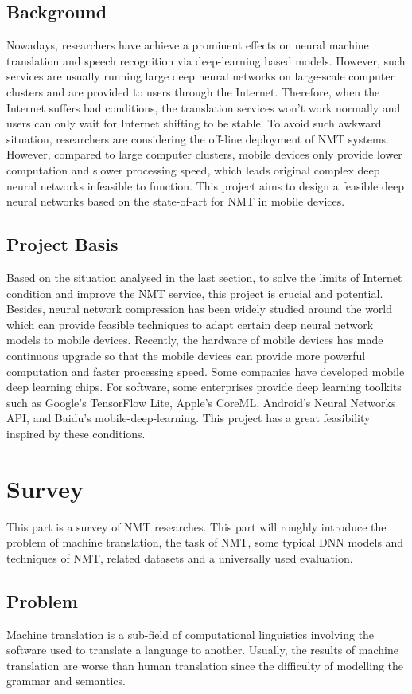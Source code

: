 \documentclass[a4paper, 12pt]{article}
\begin{document}
\subsection{Background}
Nowadays, researchers have achieve a prominent effects on neural machine translation and speech recognition via deep-learning based models. However, such services are usually running large deep neural networks on large-scale computer clusters and are provided to users through the Internet. Therefore, when the Internet suffers bad conditions, the translation services won't work normally and users can only wait for Internet shifting to be stable. To avoid such awkward situation, researchers are considering the off-line deployment of NMT systems. However, compared to large computer clusters, mobile devices only provide lower computation and slower processing speed, which leads original complex deep neural networks infeasible to function. This project aims to design a feasible deep neural networks based on the state-of-art for NMT in mobile devices.

\subsection{Project Basis}
Based on the situation analysed in the last section, to solve the limits of Internet condition and improve the NMT service, this project is crucial and potential. Besides, neural network compression has been widely studied around the world which can provide feasible techniques to adapt certain deep neural network models to mobile devices. Recently, the hardware of mobile devices has made continuous upgrade so that the mobile devices can provide more powerful computation and faster processing speed. Some companies have developed mobile deep learning chips. For software, some enterprises provide deep learning toolkits such as Google's TensorFlow Lite, Apple's CoreML, Android's Neural Networks API, and Baidu's mobile-deep-learning. This project has a great feasibility inspired by these conditions.    

\section{Survey}
This part is a survey of NMT researches. This part will roughly introduce the problem of machine translation, the task of NMT, some typical DNN models and techniques of NMT, related datasets and a universally used evaluation. 

\subsection{Problem}
Machine translation is a sub-field of computational linguistics involving the software used to translate a language to another. Usually, the results of machine translation are worse than human translation since the difficulty of modelling the grammar and semantics. 
\end{document}
